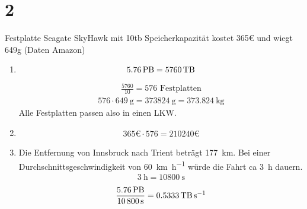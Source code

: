 \documentclass[ngerman]{scrartcl}
\begin{document}
\section*{2}
	Festplatte Seagate SkyHawk mit 10tb Speicherkapazität kostet 365€ und wiegt 649g (Daten Amazon)
	\begin{enumerate}[label=\alph*)]
		\item 
		\begin{align*}
			\SI{5,76}{\peta\byte} = \SI{5760}{\tera\byte}
		\end{align*}
		\begin{align*}
			\frac{5760}{10} = 576 \text{ Festplatten}
		\end{align*}
		\begin{align*}
			576 \cdot \SI{649}{\gram} = \SI{373824}{\gram} = \SI{373,824}{\kilogram}
		\end{align*}
		Alle Festplatten passen also in einen LKW.
		
		\item 
		\begin{align*}
			365 \text{€} \cdot 576 = 210240\text{€}
		\end{align*}
				
		\item 
		Die Entfernung von Innsbruck nach Trient beträgt \SI{177}{\kilo\metre}. Bei einer Durchschnittsgeschwindigkeit von \SI{60}{\kilo\metre\per\hour} würde die Fahrt ca \SI{3}{\hour} dauern. 
		\begin{align*}
			\SI{3}{\hour} = \SI{10800}{\second}			
		\end{align*}
		\begin{align*}
			\frac{\SI{5,76}{\peta\byte}}{\SI{10800}{\second}} = \SI{0,5333}{\tera\byte\per\second}		
		\end{align*}
	\end{enumerate}
\end{document}
